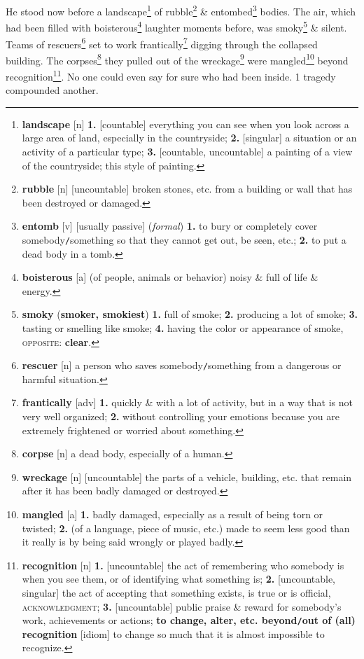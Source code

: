 \documentclass[oneside]{book}
\numberwithin{equation}{section}
\begin{document}
He stood now before a landscape\footnote{\textbf{landscape} [n] \textbf{1.} [countable] everything you can see when you look across a large area of land, especially in the countryside; \textbf{2.} [singular] a situation or an activity of a particular type; \textbf{3.} [countable, uncountable] a painting of a view of the countryside; this style of painting.} of rubble\footnote{\textbf{rubble} [n] [uncountable] broken stones, etc. from a building or wall that has been destroyed or damaged.} \& entombed\footnote{\textbf{entomb} [v] [usually passive] (\textit{formal}) \textbf{1.} to bury or completely cover somebody\texttt{/}something so that they cannot get out, be seen, etc.; \textbf{2.} to put a dead body in a tomb.} bodies. The air, which had been filled with boisterous\footnote{\textbf{boisterous} [a] (of people, animals or behavior) noisy \& full of life \& energy.} laughter moments before, was smoky\footnote{\textbf{smoky} (\textbf{smoker, smokiest}) \textbf{1.} full of smoke; \textbf{2.} producing a lot of smoke; \textbf{3.} tasting or smelling like smoke; \textbf{4.} having the color or appearance of smoke, \textsc{opposite}: \textbf{clear}.} \& silent. Teams of rescuers\footnote{\textbf{rescuer} [n] a person who saves somebody\texttt{/}something from a dangerous or harmful situation.} set to work frantically\footnote{\textbf{frantically} [adv] \textbf{1.} quickly \& with a lot of activity, but in a way that is not very well organized; \textbf{2.} without controlling your emotions because you are extremely frightened or worried about something.} digging through the collapsed building. The corpses\footnote{\textbf{corpse} [n] a dead body, especially of a human.} they pulled out of the wreckage\footnote{\textbf{wreckage} [n] [uncountable] the parts of a vehicle, building, etc. that remain after it has been badly damaged or destroyed.} were mangled\footnote{\textbf{mangled} [a] \textbf{1.} badly damaged, especially as a result of being torn or twisted; \textbf{2.} (of a language, piece of music, etc.) made to seem less good than it really is by being said wrongly or played badly.} beyond recognition\footnote{\textbf{recognition} [n] \textbf{1.} [uncountable] the act of remembering who somebody is when you see them, or of identifying what something is; \textbf{2.} [uncountable, singular] the act of accepting that something exists, is true or is official, \textsc{acknowledgment}; \textbf{3.} [uncountable] public praise \& reward for somebody's work, achievements or actions; \textbf{to change, alter, etc. beyond\texttt{/}out of (all) recognition} [idiom] to change so much that it is almost impossible to recognize.}. No one could even say for sure who had been inside. 1 tragedy compounded another.
\end{document}
